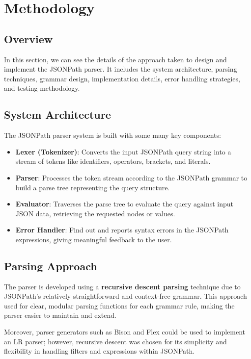 \chapter{Methodology}

\section{Overview}

In this section, we can see the details of the approach taken to design and implement the JSONPath parser. It includes the system architecture, parsing techniques, grammar design, implementation details, error handling strategies, and testing methodology.

\section{System Architecture}

The JSONPath parser system is built with some many key components:

\begin{itemize}
	\item \textbf{Lexer (Tokenizer)}: Converts the input JSONPath query string into a stream of tokens like identifiers, operators, brackets, and literals.
	\item \textbf{Parser}: Processes the token stream according to the JSONPath grammar to build a parse tree representing the query structure.
	\item \textbf{Evaluator}: Traverses the parse tree to evaluate the query against input JSON data, retrieving the requested nodes or values.
	\item \textbf{Error Handler}: Find out and reports syntax errors in the JSONPath expressions, giving meaningful feedback to the user.
\end{itemize}

\section{Parsing Approach}

The parser is developed using a \textbf{recursive descent parsing} technique due to JSONPath’s relatively straightforward and context-free grammar. This approach used for clear, modular parsing functions for each grammar rule, making the parser easier to maintain and extend.

Moreover, parser generators such as Bison and Flex could be used to implement an LR parser; however, recursive descent was chosen for its simplicity and flexibility in handling filters and expressions within JSONPath.

